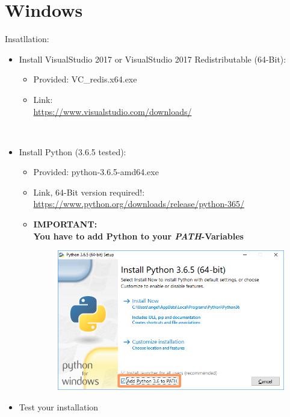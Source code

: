 \documentclass[]{article}
\begin{document}
\newpage
\section{Windows}\label{Windows}

Insatllation:
\begin{itemize}
	\item Install VisualStudio 2017 or VisualStudio 2017 Redistributable (64-Bit):
	\begin{itemize}
		\item Provided: VC\_redis.x64.exe
		\item Link:\\ \url{https://www.visualstudio.com/downloads/}
	\end{itemize}
	
	\mbox{}\\
	\item 
	Install Python (3.6.5 tested):
	\begin{itemize}
		\item Provided: python-3.6.5-amd64.exe   
		\item Link, 64-Bit version required!:\\ \url{https://www.python.org/downloads/release/python-365/} 
		\item \textbf{IMPORTANT:\\You have to add Python to your \textit{PATH}-Variables}
		\begin{figure}[H]
			\includegraphics[width=\linewidth]{pythonPathVariable.png}
		\end{figure}
	\end{itemize}

	\item Test your installation
	
\end{itemize}
\end{document}
